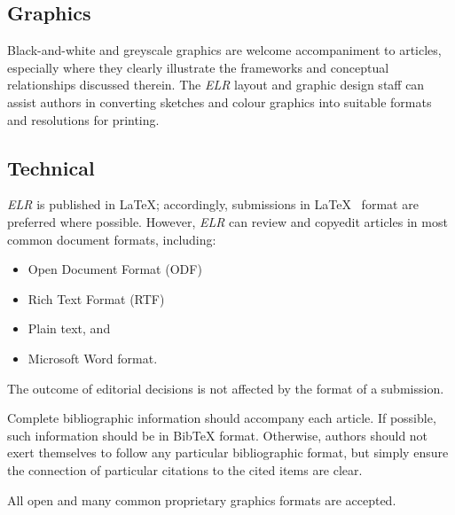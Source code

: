 \subsection{Graphics}
Black-and-white and greyscale graphics are welcome accompaniment to articles, especially where they clearly illustrate the frameworks and conceptual relationships discussed therein.
The \emph{ELR} layout and graphic design staff can assist authors in converting sketches and colour graphics into suitable formats and resolutions for printing.

\subsection{Technical}
\emph{ELR} is published in \LaTeX; accordingly, submissions in \LaTeX~ format are preferred where possible.
However, \emph{ELR} can review and copyedit articles in most common document formats, including:
\begin{itemize}
  \item Open Document Format (ODF)
  \item Rich Text Format (RTF)
  \item Plain text, and
  \item Microsoft Word format.
\end{itemize}
The outcome of editorial decisions is not affected by the format of a submission.

Complete bibliographic information should accompany each article.
If possible, such information should be in BibTeX format.
Otherwise, authors should not exert themselves to follow any particular bibliographic format, but simply ensure the connection of particular citations to the cited items are clear.

All open and many common proprietary graphics formats are accepted.
